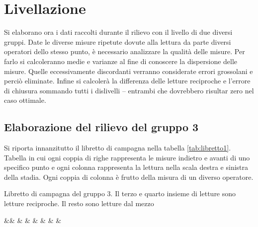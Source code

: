 \chapter{Livellazione}\label{cap:cap2}
\newcommand{\libretto}[3]{%
\begin{table}[htb]\footnotesize
\caption{#1}
\label{#2}
\centering
\csvreader[centered tabular=c@{}SSSSSSSS,
	table head=\toprule &$\mathbf{L_{dx}}$ & $\mathbf{L_{sx}}$ & $\mathbf{L_{dx}}$ %
	& $\mathbf{L_{sx}}$ & $\mathbf{L_{dx}}$ & $\mathbf{L_{sx}}$ & $\mathbf{L_{dx}}$ & $\mathbf{L_{sx}}$ \\\midrule,
	table foot = \bottomrule]%
	{#3}{}%
	{&\csvcoli & \csvcolii & \csvcoliii & %
	\csvcoliv & \csvcolv & \csvcolvi & %
	\csvcolvii & \csvcolviii}
\end{table}}
\newcommand{\elaborazione}[3]{%
\begin{table}[htb]\footnotesize
\caption{#1}
\label{#2}
\centering
\csvreader[centered tabular=c@{}rSSSSSSSS,
	no head, %
	table head=\toprule &&$\mathbf{1}$ & $\mathbf{2}$ & $\mathbf{3}$ %
	& $\mathbf{4}$ & $\mathbf{5}$ & $\mathbf{6}$ & $\mathbf{7}$ & $\mathbf{8}$ \\\midrule,
	table foot = \bottomrule]%
	{#3}{}%
	{&\textbf{\csvcolix} & \csvcoli & \csvcolii & \csvcoliii & %
	\csvcoliv & \csvcolv & \csvcolvi & %
	\csvcolvii & \csvcolviii}
\end{table}}
Si elaborano ora i dati raccolti durante il rilievo con il livello di due diversi gruppi. Date le diverse misure ripetute dovute alla lettura da parte diversi operatori dello stesso punto, è necessario analizzare la qualità delle misure. 
Per farlo si calcoleranno medie e varianze al fine di conoscere la dispersione delle misure. 
Quelle eccessivamente discordanti verranno considerate errori grossolani e perciò eliminate. 
Infine si calcolerà la differenza delle letture reciproche e  l'errore di chiusura sommando tutti i dislivelli -- entrambi che dovrebbero risultar zero nel caso ottimale.
\section{Elaborazione del rilievo del gruppo 3}
Si riporta innanzitutto il libretto di campagna nella tabella \ref{tab:libretto1}.
Tabella in cui ogni coppia di righe rappresenta le misure indietro e avanti di uno specifico punto e ogni colonna rappresenta la lettura nella scala destra e sinistra della stadia.
Ogni coppia di colonna è frutto della misura di un diverso operatore. 
\libretto{Libretto di campagna del gruppo 3. Il terzo e quarto insieme di letture sono letture reciproche. Il resto sono letture dal mezzo}{tab:libretto1}{documents/livLibretto1.csv}

